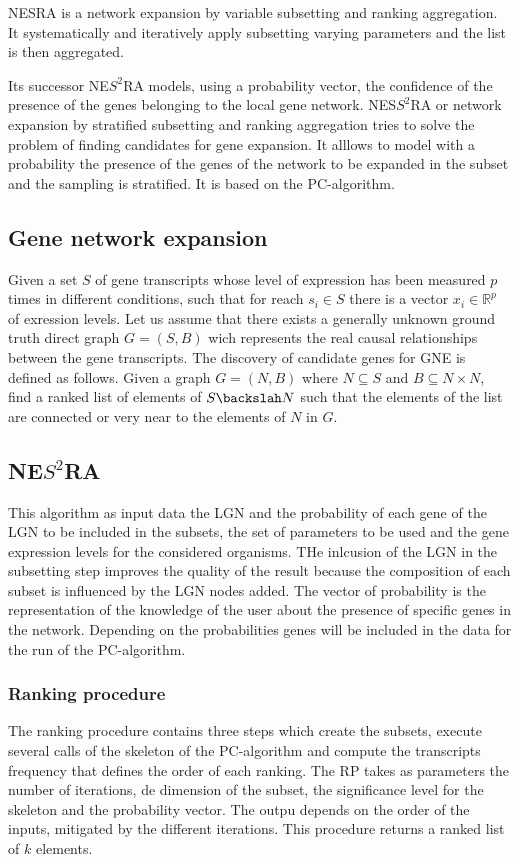 NESRA is a network expansion by variable subsetting and ranking aggregation.
It systematically and iteratively apply subsetting varying parameters and the list is then aggregated.



Its successor NE$S^2$RA models, using a probability vector, the confidence of the presence of the genes belonging to the local gene network.
NES$S^2$RA or network expansion by stratified subsetting and ranking aggregation tries to solve the problem of finding candidates for gene expansion.
It alllows to model with a probability the presence of the genes of the network to be expanded in the subset and the sampling is stratified.
It is based on the PC-algorithm.

	\subsection{Gene network expansion}
	Given a set $S$ of gene transcripts whose level of expression has been measured $p$ times in different conditions, such that for reach $s_i\in S$ there is a vector $x_i\in\mathbb{R}^p$ of exression levels.
	Let us assume that there exists a generally unknown ground truth direct graph $G=(S,B)$ wich represents the real causal relationships between the gene transcripts.
	The discovery of candidate genes for GNE is defined as follows.
	Given a graph $G=(N,B)$ where $N\subseteq S$ and $B\subseteq N\times N$, find a ranked list of elements of $S\backslah N$ such that the elements of the list are connected or very near to the elements of $N$ in $G$.

	\subsection{NE$S^2$RA}
	This algorithm as input data the LGN and the probability of each gene of the LGN to be included in the subsets, the set of parameters to be used and the gene expression levels for the considered organisms.
	THe inlcusion of the LGN in the subsetting step improves the quality of the result because the composition of each subset is influenced by the LGN nodes added.
	The vector of probability is the representation of the knowledge of the user about the presence of specific genes in the network.
	Depending on the probabilities genes will be included in the data for the run of the PC-algorithm.

		\subsubsection{Ranking procedure}
		The ranking procedure contains three steps which create the subsets, execute several calls of the skeleton of the PC-algorithm and compute the transcripts frequency that defines the order of each ranking.
		The RP takes as parameters the number of iterations, de dimension of the subset, the significance level for the skeleton and the probability vector.
		The outpu depends on the order of the inputs, mitigated by the different iterations.
		This procedure returns a ranked list of $k$ elements.

